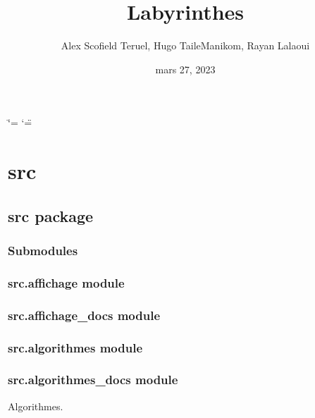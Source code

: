 \documentclass[letterpaper,10pt,french]{sphinxmanual}
\title{Labyrinthes}
\date{mars 27, 2023}
\author{Alex Scofield Teruel, Hugo Taile\sphinxhyphen{}Manikom, Rayan Lalaoui}
\begin{document}
\ifdefined\shorthandoff
  \ifnum\catcode`\=\string=\active\shorthandoff{=}\fi
  \ifnum\catcode`\"=\active{}\fi
\fi

\pagestyle{empty}
\sphinxmaketitle
\pagestyle{plain}
\sphinxtableofcontents
\pagestyle{normal}
\label{\detokenize{index::doc}}


\sphinxstepscope


\chapter{src}
\label{\detokenize{modules:src}}\label{\detokenize{modules::doc}}
\sphinxstepscope


\section{src package}
\label{\detokenize{src:src-package}}\label{\detokenize{src::doc}}

\subsection{Submodules}
\label{\detokenize{src:submodules}}

\subsection{src.affichage module}
\label{\detokenize{src:src-affichage-module}}

\subsection{src.affichage\_docs module}
\label{\detokenize{src:src-affichage-docs-module}}

\subsection{src.algorithmes module}
\label{\detokenize{src:src-algorithmes-module}}

\subsection{src.algorithmes\_docs module}
\label{\detokenize{src:module-src.algorithmes_docs}}\label{\detokenize{src:src-algorithmes-docs-module}}
\sphinxAtStartPar
Algorithmes.
\end{document}
